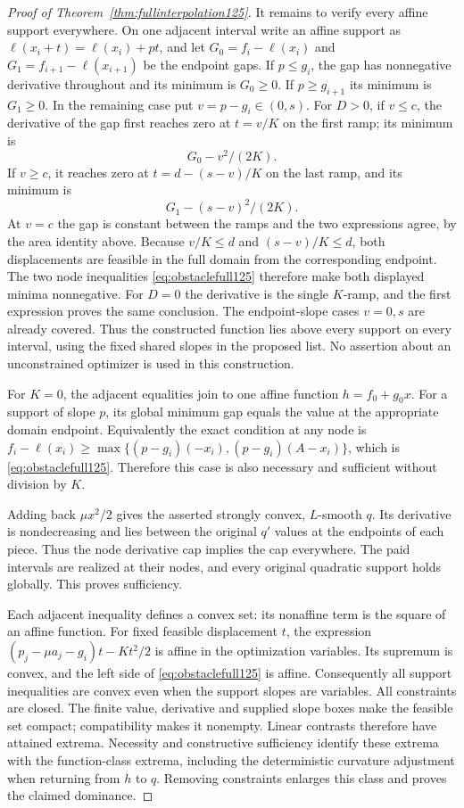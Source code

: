 \begin{proof}[Proof of Theorem~\ref{thm:fullinterpolation125}]
It remains to verify every affine support everywhere. On one
adjacent interval write an affine support as
$\ell(x_i+t)=\ell(x_i)+pt$, and let
$G_0=f_i-\ell(x_i)$ and
$G_1=f_{i+1}-\ell(x_{i+1})$ be the endpoint gaps.
If $p\le g_i$, the gap has nonnegative derivative throughout and
its minimum is $G_0\ge0$. If $p\ge g_{i+1}$ its minimum is
$G_1\ge0$. In the remaining case put $v=p-g_i\in(0,s)$.
For $D>0$, if $v\le c$, the derivative of the gap first reaches
zero at $t=v/K$ on the first ramp; its minimum is
\[
                         G_0-v^2/(2K).
\]
If $v\ge c$, it reaches zero at
$t=d-(s-v)/K$ on the last ramp, and its minimum is
\[
                         G_1-(s-v)^2/(2K).
\]
At $v=c$ the gap is constant between the ramps and the two
expressions agree, by the area identity above. Because
$v/K\le d$ and $(s-v)/K\le d$, both displacements are feasible
in the full domain from the corresponding endpoint. The two node
inequalities \eqref{eq:obstaclefull125} therefore make both
displayed minima nonnegative. For $D=0$ the derivative is the
single $K$-ramp, and the first expression proves the same conclusion.
The endpoint-slope cases $v=0,s$ are already covered. Thus the
constructed function lies above every support on every interval,
using the fixed shared slopes in the proposed list. No assertion
about an unconstrained optimizer is used in this construction.

For $K=0$, the adjacent equalities join to one affine function
$h=f_0+g_0x$. For a support of slope $p$, its global minimum gap
equals the value at the appropriate domain endpoint. Equivalently
the exact condition at any node is
$f_i-\ell(x_i)\ge\max\{(p-g_i)(-x_i),(p-g_i)(A-x_i)\}$,
which is \eqref{eq:obstaclefull125}. Therefore this case is also
necessary and sufficient without division by $K$.

Adding back $\mu x^2/2$ gives the asserted strongly convex,
$L$-smooth $q$. Its derivative is nondecreasing and lies between
the original $q'$ values at the endpoints of each piece. Thus the
node derivative cap implies the cap everywhere. The paid intervals
are realized at their nodes, and every original quadratic support
holds globally. This proves sufficiency.

Each adjacent inequality defines a convex set: its nonaffine term
is the square of an affine function. For fixed feasible displacement
$t$, the expression
$(p_j-\mu a_j-g_i)t-Kt^2/2$
is affine in the optimization variables. Its supremum is convex,
and the left side of \eqref{eq:obstaclefull125} is affine.
Consequently all support inequalities are convex even when the
support slopes are variables. All constraints are closed. The
finite value, derivative and supplied slope boxes make the feasible
set compact; compatibility makes it nonempty. Linear contrasts
therefore have attained extrema. Necessity and constructive
sufficiency identify these extrema with the function-class extrema,
including the deterministic curvature adjustment when returning from
$h$ to $q$. Removing constraints enlarges this class and proves the
claimed dominance.
\end{proof}

